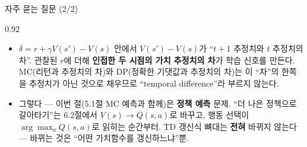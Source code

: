\begin{frame}{자주 묻는 질문 (2/2)}
\begin{center}\begin{varwidth}{0.92\textwidth}
  \begin{itemize}
    \item {}
      $\delta = r + \gamma V(s') - V(s)$ 안에서 $V(s') - V(s)$가
      ``$t{+}1$ 추정치와 $t$ 추정치의 차''. 관찰된 $r$에 더해
      \textbf{인접한 두 시점의 가치 추정치의 차}가 학습 신호를 만든다.
      MC(리턴과 추정치의 차)와 DP(정확한 기댓값과 추정치의 차)는 이
      ``차''의 한쪽을 추정치가 아닌 것으로 채우므로 ``temporal
      difference''라 부르지 않는다.
    \item {}
      그렇다 --- 이번 절(5.1절 MC 예측과 함께)은 \textbf{정책 예측} 문제.
      ``더 나은 정책으로 갈아타기''는 6.2절에서 $V(s) \to Q(s,a)$로 바꾸고,
      행동 선택이 $\arg\max_a Q(s,a)$로 읽히는 순간부터.
      TD 갱신식 뼈대는 \textbf{전혀} 바뀌지 않는다 --- 바뀌는 것은
      ``어떤 가치함수를 갱신하느냐''뿐.
  \end{itemize}
\end{varwidth}\end{center}
\end{frame}
